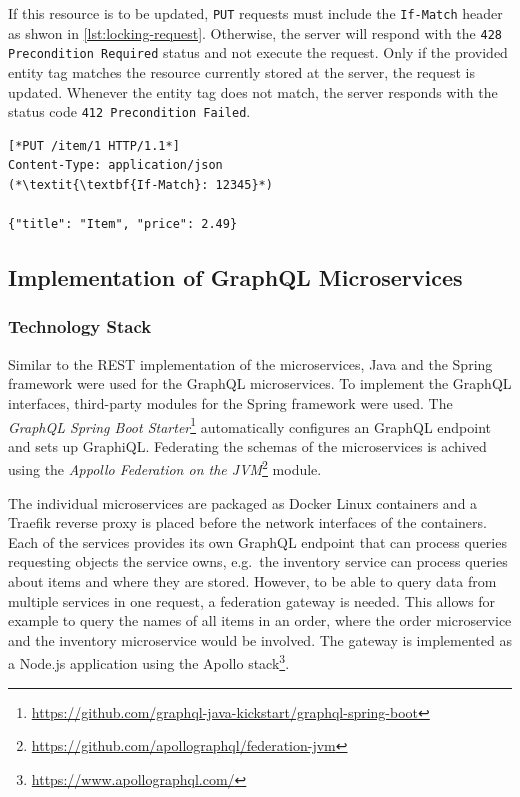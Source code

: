 If this resource is to be updated, \texttt{PUT} requests must include the \texttt{If-Match} header as shwon in \autoref{lst:locking-request}.
Otherwise, the server will respond with the \texttt{428 Precondition Required} status and not execute the request.
Only if the provided entity tag matches the resource currently stored at the server, the request is updated.
Whenever the entity tag does not match, the server responds with the status code \texttt{412 Precondition Failed}.

\begin{lstlisting}[caption={Request to Update Resources}, showlines=true, label=lst:locking-request, language=http]
[*PUT /item/1 HTTP/1.1*]
Content-Type: application/json
(*\textit{\textbf{If-Match}: 12345}*)

{"title": "Item", "price": 2.49}
\end{lstlisting}

\subsection{Implementation of GraphQL Microservices}

\subsubsection{Technology Stack}

Similar to the \ac{REST} implementation of the microservices, Java and the Spring framework were used for the GraphQL microservices.
To implement the GraphQL interfaces, third-party modules for the Spring framework were used.
The \textit{GraphQL Spring Boot Starter}\footnote{\url{https://github.com/graphql-java-kickstart/graphql-spring-boot}} automatically configures an GraphQL endpoint and sets up GraphiQL.%
Federating the schemas of the microservices is achived using the \textit{Appollo Federation on the \acs{JVM}}\footnote{\url{https://github.com/apollographql/federation-jvm}} module.

The individual microservices are packaged as Docker Linux containers and a Traefik reverse proxy is placed before the network interfaces of the containers.
Each of the services provides its own GraphQL endpoint that can process queries requesting objects the service owns, e.g.~the inventory service can process queries about items and where they are stored.
However, to be able to query data from multiple services in one request, a federation gateway is needed.
This allows for example to query the names of all items in an order, where the order microservice and the inventory microservice would be involved.
The gateway is implemented as a Node.js application using the Apollo stack\footnote{\url{https://www.apollographql.com/}}.

